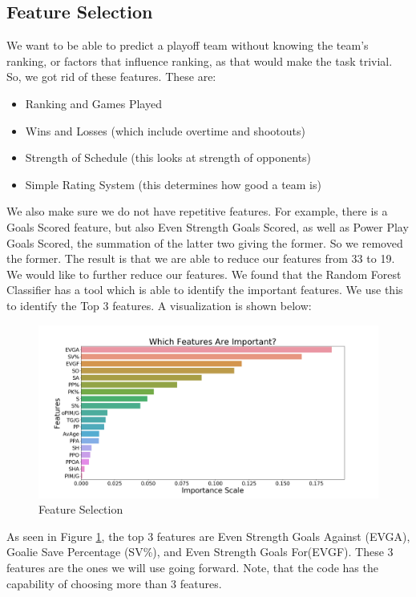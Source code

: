 \documentclass[10pt,letterpaper]{article}
\begin{document}
\subsection*{Feature Selection}
We want to be able to predict a playoff team without knowing the team's ranking, or factors that influence ranking, as that would make the task trivial. So, we got rid of these features. These are:
\begin{itemize}
    \item Ranking and Games Played
    \item Wins and Losses (which include overtime and shootouts) 
    \item Strength of Schedule (this looks at strength of opponents)
    \item Simple Rating System (this determines how good a team is)
\end{itemize}

We also make sure we do not have repetitive features. For example, there is a Goals Scored feature, but also Even Strength Goals Scored, as well as Power Play Goals Scored, the summation of the latter two giving the former. So we removed the former. The result is that we are able to reduce our features from 33 to 19. We would like to further reduce our features. We found that the Random Forest Classifier has a tool which is able to identify the important features. We use this to identify the Top 3 features. A visualization is shown below:
\begin{figure}[H]
    \centering
    \includegraphics[scale = 0.25]{Important.png}
    \caption{Feature Selection}
    \label{fig:feature}
\end{figure}
As seen in Figure \ref{fig:feature}, the top 3 features are  Even Strength Goals Against (EVGA), Goalie Save Percentage (SV\%), and Even Strength Goals For(EVGF). These 3 features are the ones we will use going forward. Note, that the code has the capability of choosing more than 3 features.
\end{document}

